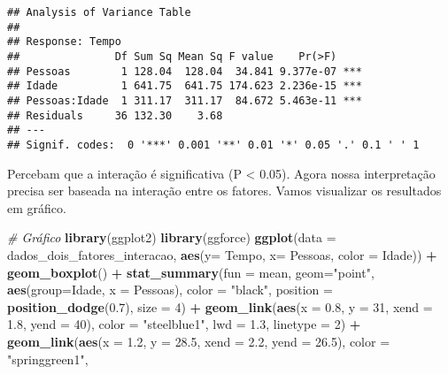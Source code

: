 \documentclass[
]{book}
\newenvironment{Shaded}{\begin{snugshade}}{\end{snugshade}}
\newcommand{\CommentTok}[1]{\textcolor[rgb]{0.56,0.35,0.01}{\textit{#1}}}
\newcommand{\DataTypeTok}[1]{\textcolor[rgb]{0.13,0.29,0.53}{#1}}
\newcommand{\DecValTok}[1]{\textcolor[rgb]{0.00,0.00,0.81}{#1}}
\newcommand{\FloatTok}[1]{\textcolor[rgb]{0.00,0.00,0.81}{#1}}
\newcommand{\KeywordTok}[1]{\textcolor[rgb]{0.13,0.29,0.53}{\textbf{#1}}}
\newcommand{\NormalTok}[1]{#1}
\newcommand{\OperatorTok}[1]{\textcolor[rgb]{0.81,0.36,0.00}{\textbf{#1}}}
\newcommand{\StringTok}[1]{\textcolor[rgb]{0.31,0.60,0.02}{#1}}
\begin{document}
\begin{verbatim}
## Analysis of Variance Table
## 
## Response: Tempo
##               Df Sum Sq Mean Sq F value    Pr(>F)    
## Pessoas        1 128.04  128.04  34.841 9.377e-07 ***
## Idade          1 641.75  641.75 174.623 2.236e-15 ***
## Pessoas:Idade  1 311.17  311.17  84.672 5.463e-11 ***
## Residuals     36 132.30    3.68                      
## ---
## Signif. codes:  0 '***' 0.001 '**' 0.01 '*' 0.05 '.' 0.1 ' ' 1
\end{verbatim}

Percebam que a interação é significativa (P \textless{} 0.05). Agora nossa interpretação precisa ser baseada na interação entre os fatores. Vamos visualizar os resultados em gráfico.

\begin{Shaded}
\begin{Highlighting}[]
\CommentTok{# Gráfico}
\KeywordTok{library}\NormalTok{(ggplot2)}
\KeywordTok{library}\NormalTok{(ggforce)}
\KeywordTok{ggplot}\NormalTok{(}\DataTypeTok{data =}\NormalTok{ dados_dois_fatores_interacao, }\KeywordTok{aes}\NormalTok{(}\DataTypeTok{y=}\NormalTok{ Tempo, }\DataTypeTok{x=}\NormalTok{ Pessoas, }\DataTypeTok{color =}\NormalTok{ Idade)) }\OperatorTok{+}\StringTok{ }
\StringTok{  }\KeywordTok{geom_boxplot}\NormalTok{() }\OperatorTok{+}
\StringTok{  }\KeywordTok{stat_summary}\NormalTok{(}\DataTypeTok{fun =}\NormalTok{ mean, }\DataTypeTok{geom=}\StringTok{"point"}\NormalTok{, }\KeywordTok{aes}\NormalTok{(}\DataTypeTok{group=}\NormalTok{Idade, }\DataTypeTok{x =}\NormalTok{ Pessoas), }\DataTypeTok{color =} \StringTok{"black"}\NormalTok{,}
               \DataTypeTok{position =} \KeywordTok{position_dodge}\NormalTok{(}\FloatTok{0.7}\NormalTok{), }\DataTypeTok{size  =} \DecValTok{4}\NormalTok{) }\OperatorTok{+}
\StringTok{  }\KeywordTok{geom_link}\NormalTok{(}\KeywordTok{aes}\NormalTok{(}\DataTypeTok{x =} \FloatTok{0.8}\NormalTok{, }\DataTypeTok{y =} \DecValTok{31}\NormalTok{, }\DataTypeTok{xend =} \FloatTok{1.8}\NormalTok{, }\DataTypeTok{yend =} \DecValTok{40}\NormalTok{), }\DataTypeTok{color =} \StringTok{"steelblue1"}\NormalTok{, }
            \DataTypeTok{lwd  =} \FloatTok{1.3}\NormalTok{, }\DataTypeTok{linetype =} \DecValTok{2}\NormalTok{) }\OperatorTok{+}\StringTok{ }
\StringTok{  }\KeywordTok{geom_link}\NormalTok{(}\KeywordTok{aes}\NormalTok{(}\DataTypeTok{x =} \FloatTok{1.2}\NormalTok{, }\DataTypeTok{y =} \FloatTok{28.5}\NormalTok{, }\DataTypeTok{xend =} \FloatTok{2.2}\NormalTok{, }\DataTypeTok{yend =} \FloatTok{26.5}\NormalTok{), }\DataTypeTok{color =} \StringTok{"springgreen1"}\NormalTok{, }

\end{Highlighting}
\end{Shaded}
\end{document}
